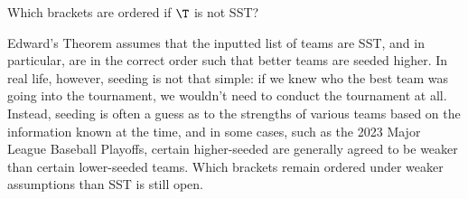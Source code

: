 {\begin{oq}{}{}
    Which brackets are ordered if $\T$ is not SST?
\end{oq}

Edward's Theorem assumes that the inputted list of teams are SST, and in particular, are in the correct order such that better teams are seeded higher. In real life, however, seeding is not that simple: if we knew who the best team was going into the tournament, we wouldn't need to conduct the tournament at all. Instead, seeding is often a guess as to the strengths of various teams based on the information known at the time, and in some cases, such as the 2023 Major League Baseball Playoffs, certain higher-seeded are generally agreed to be weaker than certain lower-seeded teams. Which brackets remain ordered under weaker assumptions than SST is still open.
}